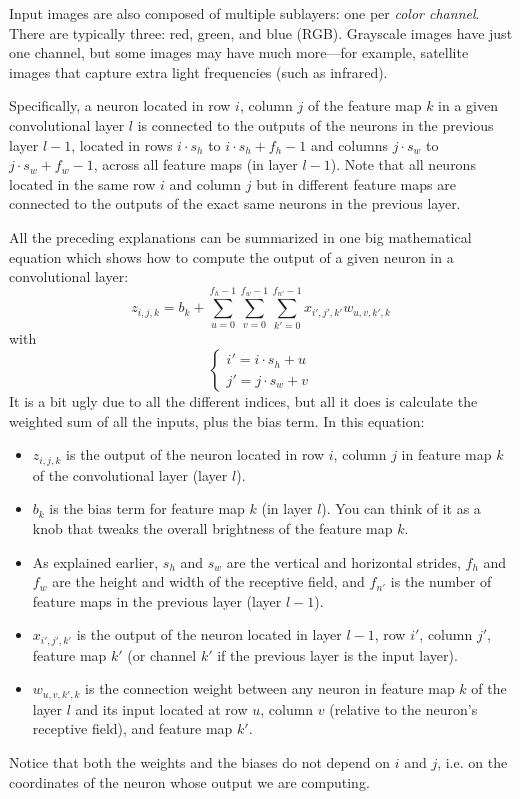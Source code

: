 Input images are also composed of multiple sublayers: one per \emph{color channel}. There are typically three: red, green, and blue (RGB). Grayscale images have just one channel, but some images may have much more—for example, satellite images that capture extra light frequencies (such as infrared).

Specifically, a neuron located in row $i$, column $j$ of the feature map $k$ in a given convolutional layer $l$ is connected to the outputs of the neurons in the previous layer $l-1$, located in rows $i\cdot s_h$ to $i\cdot s_h+f_h-1$ and columns $j\cdot s_w$ to $j\cdot s_w+f_w-1$, across all feature maps (in layer $l-1$). Note that all neurons located in the same row $i$ and column $j$ but in different feature maps are connected to the outputs of the exact same neurons in the previous layer.

All the preceding explanations can be summarized in one big mathematical equation which shows how to compute the output of a given neuron in a convolutional layer:
\begin{equation}
z_{i,j,k}=b_k+\sum_{u=0}^{f_h-1}\sum_{v=0}^{f_w-1}\sum_{k'=0}^{f_{n'}-1}x_{i',j',k'}w_{u,v,k',k}
\end{equation}
with
\begin{equation}
\begin{cases}
i'=i\cdot s_h+u\\
j'=j\cdot s_w+v
\end{cases}
\end{equation}
It is a bit ugly due to all the different indices, but all it does is calculate the weighted sum of all the inputs, plus
the bias term. In this equation:
\begin{itemize}
\item $z_{i,j,k}$ is the output of the neuron located in row $i$, column $j$ in feature map $k$ of the convolutional layer (layer $l$).
\item $b_k$ is the bias term for feature map $k$ (in layer $l$). You can think of it as a knob that tweaks the overall brightness of the feature map $k$.
\item As explained earlier, $s_h$ and $s_w$ are the vertical and horizontal strides, $f_h$ and $f_w$ are the height and width of the receptive field, and $f_{n'}$ is the number of feature maps in the previous layer (layer $l-1$).
\item $x_{i',j',k'}$ is the output of the neuron located in layer $l-1$, row $i'$, column $j'$, feature map $k'$ (or channel $k'$ if the previous layer is the input layer).
\item $w_{u,v,k',k}$ is the connection weight between any neuron in feature map $k$ of the layer $l$ and its input located at row $u$, column $v$ (relative to the neuron's receptive field), and feature map $k'$.
\end{itemize}
Notice that both the weights and the biases do not depend on $i$ and $j$, i.e. on the coordinates of the neuron whose output we are computing.

